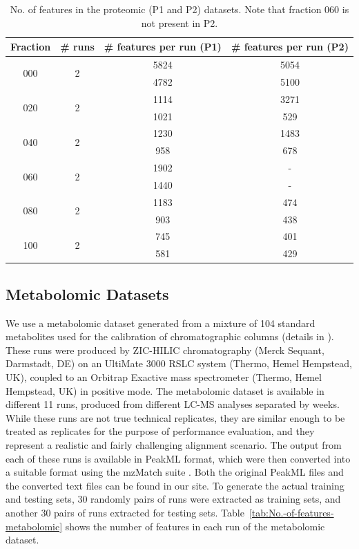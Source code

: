 \begin{table}[!htbp]
\noindent \begin{centering}
\begin{tabular}{|c|c|c|c|}
\hline 
Fraction & \# runs & \# features per run (P1) & \# features per run (P2)\tabularnewline
\hline 
\hline 
\multirow{2}{*}{000} & \multirow{2}{*}{2} & 5824 & 5054\tabularnewline
\cline{3-4} 
 &  & 4782 & 5100\tabularnewline
\hline 
\multirow{2}{*}{020} & \multirow{2}{*}{2} & 1114 & 3271\tabularnewline
\cline{3-4} 
 &  & 1021 & 529\tabularnewline
\hline 
\multirow{2}{*}{040} & \multirow{2}{*}{2} & 1230 & 1483\tabularnewline
\cline{3-4} 
 &  & 958 & 678\tabularnewline
\hline 
\multirow{2}{*}{060} & \multirow{2}{*}{2} & 1902 & -\tabularnewline
\cline{3-4} 
 &  & 1440 & -\tabularnewline
\hline 
\multirow{2}{*}{080} & \multirow{2}{*}{2} & 1183 & 474\tabularnewline
\cline{3-4} 
 &  & 903 & 438\tabularnewline
\hline 
\multirow{2}{*}{100} & \multirow{2}{*}{2} & 745 & 401\tabularnewline
\cline{3-4} 
 &  & 581 & 429\tabularnewline
\hline 
\end{tabular}
\par\end{centering}
\caption{\label{tab:No.-of-features-P1}No. of features in the proteomic (P1 and P2) datasets. Note that fraction 060 is not present in P2.}
\end{table}


\subsection{Metabolomic Datasets\label{sub:metabolomic-dataset}}

We use a metabolomic dataset generated from a mixture of 104 standard metabolites used for the calibration of chromatographic columns (details in \cite{Creek2011}). These runs were produced by ZIC-HILIC chromatography (Merck Sequant, Darmstadt, DE) on an UltiMate 3000 RSLC system (Thermo, Hemel Hempstead, UK), coupled to an Orbitrap Exactive mass spectrometer (Thermo, Hemel Hempstead, UK) in positive mode. The metabolomic dataset is available in different 11 runs, produced from different LC-MS analyses separated by weeks. While these runs are not true technical replicates, they are similar enough to be treated as replicates for the purpose of performance evaluation, and they represent a realistic and fairly challenging alignment scenario. The output from each of these runs is available in PeakML format, which were then converted into a suitable format using the mzMatch suite \cite{Scheltema2011}. Both the original PeakML files and the converted text files can be found in our site. To generate the actual training and testing sets, 30 randomly pairs of runs were extracted as training sets, and another 30 pairs of runs extracted for testing sets. Table~\ref{tab:No.-of-features-metabolomic} shows the number of features in each run of the metabolomic dataset.

